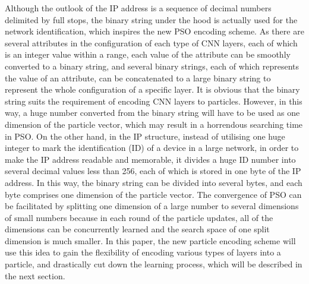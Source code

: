 \documentclass[conference]{IEEEtran}
\begin{document}
Although the outlook of the IP address is a sequence of decimal numbers delimited by full stops, the binary string under the hood is actually used for the network identification, which inspires the new PSO encoding scheme. As there are several attributes in the configuration of each type of CNN layers, each of which is an integer value within a range, each value of the attribute can be smoothly converted to a binary string, and several binary strings, each of which represents the value of an attribute, can be concatenated to a large binary string to represent the whole configuration of a specific layer. It is obvious that the binary string suits the requirement of encoding CNN layers to particles. However, in this way, a huge number converted from the binary string will have to be used as one dimension of the particle vector, which may result in a horrendous searching time in PSO. On the other hand, in the IP structure, instead of utilising one huge integer to mark the identification (ID) of a device in a large network, in order to make the IP address readable and memorable, it divides a huge ID number into several decimal values less than 256, each of which is stored in one byte of the IP address. In this way, the binary string can be divided into several bytes, and each byte comprises one dimension of the particle vector. The convergence of PSO can be facilitated by splitting one dimension of a large number to several dimensions of small numbers because in each round of the particle updates, all of the dimensions can be concurrently learned and the search space of one split dimension is much smaller. In this paper, the new particle encoding scheme will use this idea to gain the flexibility of encoding various types of layers into a particle, and drastically cut down the learning process, which will be described in the next section.


%
\end{document}
